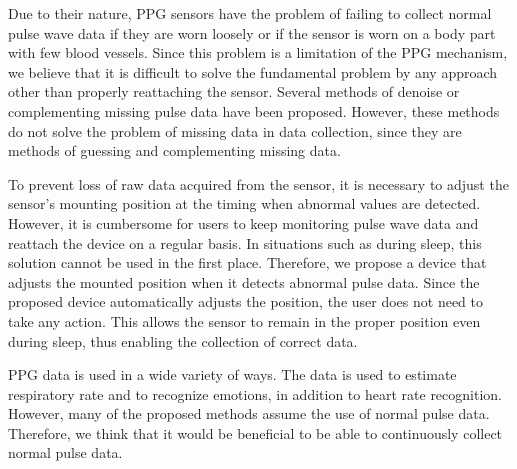 \documentclass[sigconf]{acmart}
\begin{document}
Due to their nature, PPG sensors have the problem of failing to collect normal pulse wave data if they are worn loosely or if the sensor is worn on a body part with few blood vessels. Since this problem is a limitation of the PPG mechanism, we believe that it is difficult to solve the fundamental problem by any approach other than properly reattaching the sensor. Several methods of denoise or complementing missing pulse data have been proposed. However, these methods do not solve the problem of missing data in data collection, since they are methods of guessing and complementing missing data.\par

To prevent loss of raw data acquired from the sensor, it is necessary to adjust the sensor's mounting position at the timing when abnormal values are detected. However, it is cumbersome for users to keep monitoring pulse wave data and reattach the device on a regular basis. In situations such as during sleep, this solution cannot be used in the first place. Therefore, we propose a device that adjusts the mounted position when it detects abnormal pulse data. Since the proposed device automatically adjusts the position, the user does not need to take any action. This allows the sensor to remain in the proper position even during sleep, thus enabling the collection of correct data.\par

PPG data is used in a wide variety of ways. The data is used to estimate respiratory rate and to recognize emotions, in addition to heart rate recognition. However, many of the proposed methods assume the use of normal pulse data. Therefore, we think that it would be beneficial to be able to continuously collect normal pulse data.\par
\end{document}
